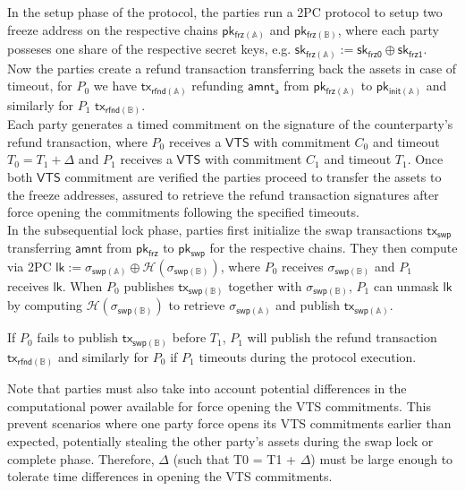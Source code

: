 \documentclass{article}      	%
\begin{document}
In the setup phase of the protocol, the parties run a 2PC protocol to setup two freeze address on the respective chains $\mathsf{pk_{frz(\mathbb{A})}}$ and $\mathsf{pk_{frz(\mathbb{B})}}$, where each party posseses one share of the respective secret keys, e.g. $\mathsf{sk_{frz(\mathbb{A})}} := \mathsf{sk_{frz0}} \oplus  \mathsf{sk_{frz1}}$. \\
Now the parties create a refund transaction transferring back the assets in case of timeout, for $P_0$ we have $\mathsf{tx_{rfnd(\mathbb{A})}}$ refunding $\mathsf{amnt_a}$ from $\mathsf{pk_{frz(\mathbb{A})}}$ to $\mathsf{pk_{init(\mathbb{A})}}$ and similarly for $P_1$ $\mathsf{tx_{rfnd(\mathbb{B})}}$. \\
Each party generates a timed commitment on the signature of the counterparty's refund transaction, where $P_0$ receives a $\mathsf{VTS}$ with commitment $C_0$ and timeout $T_0 = T_1 + \Delta$ and $P_1$ receives a $\mathsf{VTS}$ with commitment $C_1$ and timeout $T_1$. Once both $\mathsf{VTS}$ commitment are verified the parties proceed to transfer the assets to the freeze addresses, assured to retrieve the refund transaction signatures after force opening the commitments following the specified timeouts. \\

In the subsequential lock phase, parties first initialize the swap transactions $\mathsf{tx_{swp}}$ transferring $\mathsf{amnt}$ from $\mathsf{pk_{frz}}$ to $\mathsf{pk_{swp}}$ for the respective chains. They then compute via 2PC $\mathsf{lk} := \sigma_{\mathsf{swp}(\mathbb{A})} \oplus \mathcal{H}(\sigma_{\mathsf{swp}(\mathbb{B})})$, where  $P_0$ receives $\sigma_{\mathsf{swp}(\mathbb{B})}$ and $P_1$ receives $\mathsf{lk}$.  When $P_0$ publishes $\mathsf{tx_{swp(\mathbb{B})}}$ together with  $\sigma_{\mathsf{swp}(\mathbb{B})}$, $P_1$ can unmask $\mathsf{lk}$ by computing $\mathcal{H}(\sigma_{\mathsf{swp}(\mathbb{B})})$ to retrieve $\sigma_{\mathsf{swp}(\mathbb{A})}$ and publish $\mathsf{tx_{swp(\mathbb{A})}}$.

 If $P_0$ fails to publish $\mathsf{tx_{swp(\mathbb{B})}}$ before $T_1$, $P_1$ will publish the refund transaction $\mathsf{tx_{rfnd(\mathbb{B})}}$ and similarly for $P_0$ if $P_1$ timeouts during the protocol execution.

Note that parties must also take into account potential differences in the computational power available for force opening the VTS commitments. This prevent scenarios where one party force opens its VTS commitments earlier than expected, potentially stealing 
 the other party's assets during the swap lock or complete phase. Therefore,  $\Delta$ (such that T0 = T1 + $\Delta$) must be large enough to tolerate time differences in opening the VTS commitments. \\
\end{document}
